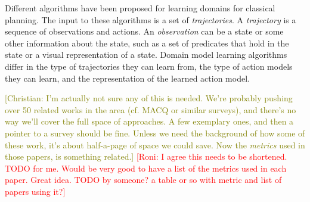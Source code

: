 \documentclass{article}
\theoremstyle{definition}
\theoremstyle{remark}
\newcommand{\todo}[1]{{\textcolor{red}{[TODO: #1]}}}
\newcommand{\roni}[1]{{\textcolor{red}{[Roni: #1]}}}
\newcommand{\cm}[1]{{\textcolor{olive}{[Christian: #1]}}}
\begin{document}
Different algorithms have been proposed for learning domains for classical planning. 
The input to these algorithms is a set of \emph{trajectories}. 
A \emph{trajectory} is a sequence of observations and actions. 
An \emph{observation} can be a state or some other information about the state, 
such as a set of predicates that hold in the state or a visual representation of a state. 
Domain model learning algorithms differ in the type of trajectories they can learn from, the type of action models they can learn, and the representation of the learned action model. 


\cm{I'm actually not sure any of this is needed. We're probably pushing over 50 related works in the area (cf. MACQ or similar surveys), and there's no way we'll cover the full space of approaches. A few exemplary ones, and then a pointer to a survey should be fine. Unless we need the background of how some of these work, it's about half-a-page of space we could save. Now the \textit{metrics} used in those papers, is something related.}
\roni{I agree this needs to be shortened. TODO for me. Would be very good to have a list of the metrics used in each paper. Great idea. TODO by someone? a table or so with metric and list of papers using it?}
\end{document}
